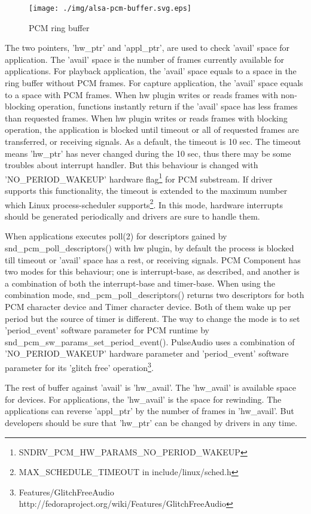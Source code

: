 \documentclass[onecolumn]{article}
\begin{document}
\begin{figure}[H]
	\centering
	\texttt{[image: ./img/alsa-pcm-buffer.svg.eps]}
	\caption{{PCM ring buffer}}
	\label{alsa-pcm-buffer}
\end{figure}

The two pointers, 'hw\_ptr' and 'appl\_ptr', are used to check 'avail' space for application. The 'avail' space is the number of frames currently available for applications. For playback application, the 'avail' space equals to a space in the ring buffer without PCM frames. For capture application, the 'avail' space equals to a space with PCM frames. When hw plugin writes or reads frames with non-blocking operation, functions instantly return if the 'avail' space has less frames than requested frames. When hw plugin writes or reads frames with blocking operation, the application is blocked until timeout or all of requested frames are transferred, or receiving signals. As a default, the timeout is 10 sec. The timeout means 'hw\_ptr' has never changed during the 10 sec, thus there may be some troubles about interrupt handler. But this behaviour is changed with 'NO\_PERIOD\_WAKEUP' hardware flag\footnote{SNDRV\_PCM\_HW\_PARAMS\_NO\_PERIOD\_WAKEUP} for PCM substream. If driver supports this functionality, the timeout is extended to the maximum number which Linux process-scheduler supports\footnote{MAX\_SCHEDULE\_TIMEOUT in include/linux/sched.h}. In this mode, hardware interrupts should be generated periodically and drivers are sure to handle them.

When applications executes poll(2) for descriptors gained by snd\_pcm\_poll\_descriptors() with hw plugin, by default the process is blocked till timeout or 'avail' space has a rest, or receiving signals. PCM Component has two modes for this behaviour; one is interrupt-base, as described, and another is a combination of both the interrupt-base and timer-base. When using the combination mode, snd\_pcm\_poll\_descriptors() returns two descriptors for both PCM character device and Timer character device. Both of them wake up per period but the source of timer is different. The way to change the mode is to set 'period\_event' software parameter for PCM runtime by snd\_pcm\_sw\_params\_set\_period\_event(). PulseAudio uses a combination of 'NO\_PERIOD\_WAKEUP' hardware parameter and 'period\_event' software parameter for its 'glitch free' operation\footnote{Features/GlitchFreeAudio http://fedoraproject.org/wiki/Features/GlitchFreeAudio}.

The rest of buffer against 'avail' is 'hw\_avail'. The 'hw\_avail' is available space for devices. For applications, the 'hw\_avail' is the space for rewinding. The applications can reverse 'appl\_ptr' by the number of frames in 'hw\_avail'. But developers should be sure that 'hw\_ptr' can be changed by drivers in any time.
\end{document}
